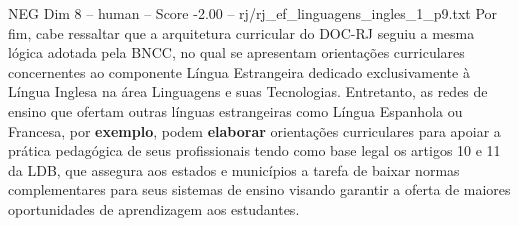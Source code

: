 \begin{textsample}{NEG Dim 8 – human – Score -2.00 – rj/rj\_ef\_linguagens\_ingles\_1\_p9.txt}  \label{ex:f8_neg_003}
Por fim, cabe ressaltar que a arquitetura curricular do DOC-RJ seguiu a mesma lógica adotada pela BNCC, no qual se apresentam orientações curriculares concernentes ao componente Língua Estrangeira dedicado exclusivamente à Língua Inglesa na área Linguagens e suas Tecnologias.
Entretanto, as redes de ensino que ofertam outras línguas estrangeiras como Língua Espanhola ou Francesa, por \textbf{exemplo}, podem \textbf{elaborar} orientações curriculares para apoiar a prática pedagógica de seus profissionais tendo como base legal os artigos 10 e 11 da LDB, que assegura aos estados e municípios a tarefa de baixar normas complementares para seus sistemas de ensino visando garantir a oferta de maiores oportunidades de aprendizagem aos estudantes.

\end{textsample}
